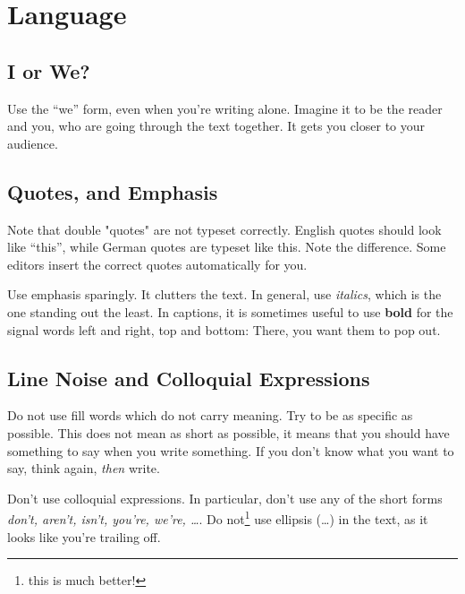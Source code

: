 \documentclass[12pt, %
a4paper, %
twoside, %
openright, %
abstract=on, %
DIV=11,      %
BCOR=8mm]{scrbook} %
\begin{document}
    \newpage
    \tableofcontents
    \listoffigures
    \listofalgorithms

    \newpage
    \mainmatter
    

    \chapter{Language}

    \section{I or We?}

    Use the ``we'' form, even when  you're writing alone.  Imagine it to be
    the reader and  you, who are going through the  text together.  It gets
    you closer to your audience.

    \section{Quotes, and Emphasis}
    Note that double  "quotes" are not typeset  correctly.  English quotes 
    should look like ``this'', while  German quotes are typeset like \glqq 
    this\grqq.   Note the  difference.   Some editors  insert the  correct 
    quotes automatically for you.                                          

    Use  emphasis  sparingly.  It  clutters  the  text.  In  general,  use 
    \emph{italics}, which is the one standing out the least.  In captions, 
    it is sometimes useful to use  \textbf{bold} for the signal words left 
    and right, top and bottom: There, you want them to pop out.

    \section{Line Noise and Colloquial Expressions}

    Do  not use  fill words  which do  not carry  meaning.  Try  to be  as 
    specific as  possible.  This does  not mean  as short as  possible, it 
    means that you should have something to say when you write something.
    If you don't know what you want to say, think again, \emph{then} write.

    Don't use colloquial expressions.  In particular, don't use any of the 
    short forms  \emph{don't, aren't,  isn't, you're, we're,  \ldots}.  Do 
    not\footnote{this is much better!} use  ellipsis (\ldots) in the text, 
    as it looks like you're trailing off.                                  
\end{document}
